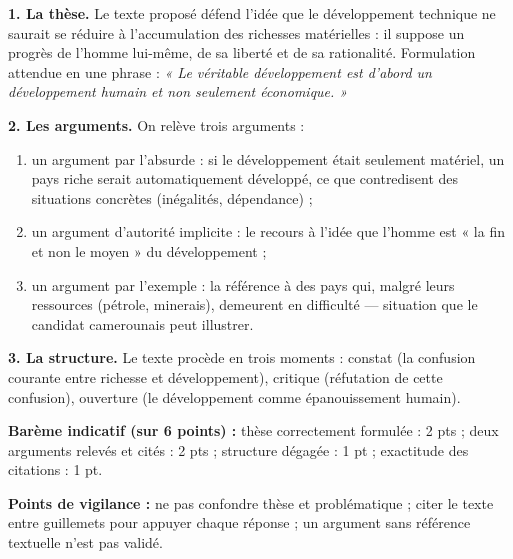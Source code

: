 \documentclass[11pt]{article}
\begin{document}
\begin{corrige}
\textbf{1. La thèse.} Le texte proposé défend l'idée que le développement technique ne saurait se réduire à l'accumulation des richesses matérielles : il suppose un progrès de l'homme lui-même, de sa liberté et de sa rationalité. Formulation attendue en une phrase : \emph{« Le véritable développement est d'abord un développement humain et non seulement économique. »}

\textbf{2. Les arguments.} On relève trois arguments :
\begin{enumerate}
\item un argument par l'absurde : si le développement était seulement matériel, un pays riche serait automatiquement développé, ce que contredisent des situations concrètes (inégalités, dépendance) ;
\item un argument d'autorité implicite : le recours à l'idée que l'homme est « la fin et non le moyen » du développement ;
\item un argument par l'exemple : la référence à des pays qui, malgré leurs ressources (pétrole, minerais), demeurent en difficulté — situation que le candidat camerounais peut illustrer.
\end{enumerate}

\textbf{3. La structure.} Le texte procède en trois moments : constat (la confusion courante entre richesse et développement), critique (réfutation de cette confusion), ouverture (le développement comme épanouissement humain).

\textbf{Barème indicatif (sur 6 points) :} thèse correctement formulée : 2 pts ; deux arguments relevés et cités : 2 pts ; structure dégagée : 1 pt ; exactitude des citations : 1 pt.

\textbf{Points de vigilance :} ne pas confondre thèse et problématique ; citer le texte entre guillemets pour appuyer chaque réponse ; un argument sans référence textuelle n'est pas validé.
\end{corrige}
\end{document}
